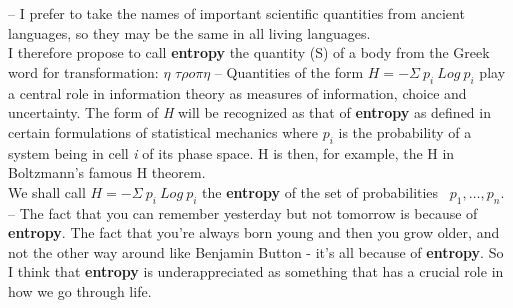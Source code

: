 \documentclass[12pt, a4paper, titlepage, openany]{book}
\begin{document}
\frontmatter



\begin{savequote}[100mm]
  
\qauthor{ }
-- I prefer to take the names of important scientific quantities from ancient languages, so they may be the same in all living languages. \\I therefore propose to call \textbf{entropy} the quantity (S) of a body  from the Greek word for transformation: $\eta$ $\tau\rho o\pi\eta$
-- Quantities of the form $H = -\Sigma\ p_i\ Log\ p_i$ play a central role in information theory as measures of information, choice and uncertainty. The form of \emph{H} will be recognized as that of \textbf{entropy} as defined in certain formulations of statistical mechanics where $p_i$ is the probability of a system being in cell \emph{i} of its phase space. H is then, for example, the H in Boltzmann's famous H theorem.\\
We shall call $H = -\Sigma\ p_i\ Log\ p_i$ the \textbf{entropy} of the set of probabilities \  $p_1, \dots, p_n$.
-- The fact that you can remember yesterday but not tomorrow is because of \textbf{entropy}. The fact that you're always born young and then you grow older, and not the other way around like Benjamin Button - it's all because of \textbf{entropy}. So I think that \textbf{entropy} is underappreciated as something that has a crucial role in how we go through life.
\end{savequote}
\end{document}
